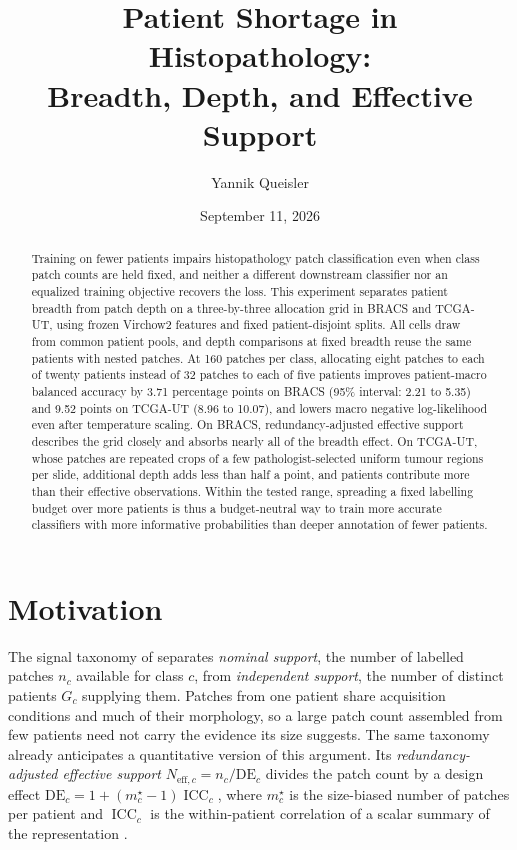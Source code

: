 \documentclass[11pt]{article}
\title{Patient Shortage in Histopathology:\\Breadth, Depth, and Effective Support}
\author{Yannik Queisler}
\date{September 11, 2026}
\newcommand{\ICC}{\operatorname{ICC}}
\newcommand{\DE}{\mathrm{DE}}
\begin{document}
\raggedbottom
{}
\setlength{\emergencystretch}{2em}
\maketitle
\begin{abstract}
\noindent Training on fewer patients impairs histopathology patch classification even when class patch counts are held fixed, and neither a different downstream classifier nor an equalized training objective recovers the loss. This experiment separates patient breadth from patch depth on a three-by-three allocation grid in BRACS and TCGA-UT, using frozen Virchow2 features and fixed patient-disjoint splits. All cells draw from common patient pools, and depth comparisons at fixed breadth reuse the same patients with nested patches. At 160 patches per class, allocating eight patches to each of twenty patients instead of 32 patches to each of five patients improves patient-macro balanced accuracy by 3.71 percentage points on BRACS (95\% interval: 2.21 to 5.35) and 9.52 points on TCGA-UT (8.96 to 10.07), and lowers macro negative log-likelihood even after temperature scaling. On BRACS, redundancy-adjusted effective support describes the grid closely and absorbs nearly all of the breadth effect. On TCGA-UT, whose patches are repeated crops of a few pathologist-selected uniform tumour regions per slide, additional depth adds less than half a point, and patients contribute more than their effective observations. Within the tested range, spreading a fixed labelling budget over more patients is thus a budget-neutral way to train more accurate classifiers with more informative probabilities than deeper annotation of fewer patients.
\end{abstract}
\setcounter{tocdepth}{1}
\tableofcontents
\clearpage

\section{Motivation}
\label{sec:motivation}
The signal taxonomy of \citet{queisler2026imbalanceMethods} separates \emph{nominal support}, the number of labelled patches $n_c$ available for class $c$, from \emph{independent support}, the number of distinct patients $G_c$ supplying them. Patches from one patient share acquisition conditions and much of their morphology, so a large patch count assembled from few patients need not carry the evidence its size suggests. The same taxonomy already anticipates a quantitative version of this argument. Its \emph{redundancy-adjusted effective support} $N_{\mathrm{eff},c}=n_c/\DE_c$ divides the patch count by a design effect $\DE_c=1+(m^{\star}_c-1)\ICC_c$, where $m^{\star}_c$ is the size-biased number of patches per patient and $\ICC_c$ is the within-patient correlation of a scalar summary of the representation \citep{kish1965survey,rutterford2015methods}.
\end{document}
